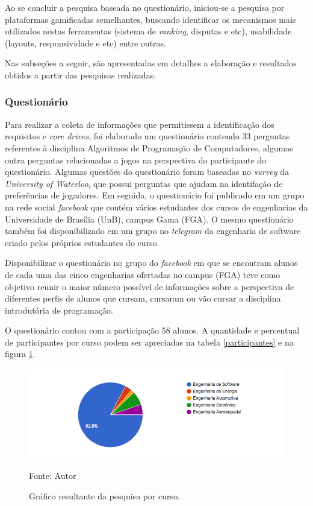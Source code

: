 Ao se concluir a pesquisa baseada no questionário, iniciou-se a pesquisa por plataformas gamificadas semelhantes, buscando
identificar os mecanismos mais utilizados nestas ferramentas (sistema de \textit{ranking}, disputas e etc), usabilidade (layouts, responsividade e etc) entre outras.

Nas subseções a seguir, são apresentadas em detalhes a elaboração e resultados obtidos a partir das pesquisas realizadas.

\subsubsection{Questionário}
Para realizar a coleta de informações que permitissem a identificação dos requisitos e \textit{core drives}, foi elaborado um questionário 
contendo 33 perguntas referentes à disciplina Algoritmos de Programação de Computadores, algumas outra perguntas
relacionadas a jogos na perspectiva do participante do questionário. Algumas questões do questionário foram baseadas no \textit{survey}
da \textit{University of Waterloo}, que possui perguntas que ajudam na identifação de preferências de jogadores.
Em seguida, o questionário foi publicado em um grupo na rede social \textit{facebook} que contém
vários estudantes dos cursos de engenharias da Universidade de Brasília (UnB), campus Gama (FGA). O mesmo questionário
também foi disponibilizado em um grupo no \textit{telegram} da engenharia de software criado pelos próprios estudantes do
curso. 

Disponibilizar o questionário no grupo do \textit{facebook} em que se encontram alunos de cada uma das cinco engenharias ofertadas no campus (FGA)
teve como objetivo reunir o maior número possível de informações sobre a perspectiva de diferentes perfis de alunos que cursam, cursaram ou vão
cursar a disciplina introdutória de programação.

O questionário contou com a participação 58 alunos. A quantidade e percentual de participantes por curso podem ser apreciadas na tabela \ref{participantes} e
na figura \ref{graficocurso}.

\begin{figure}[h]
	\centering
	\includegraphics[keepaspectratio=true,scale=0.75]{figuras/graficocurso.png}
	\caption{Gráfico resultante da pesquisa por curso.}
	Fonte: {Autor}
	\label{graficocurso}
\end{figure}


